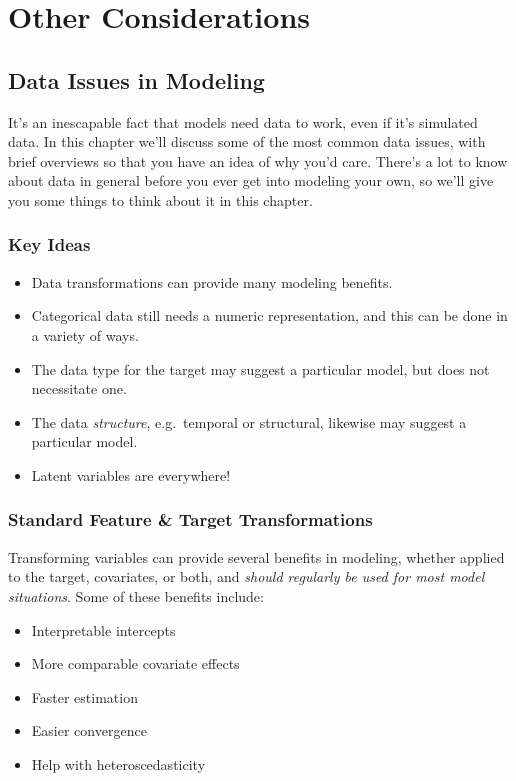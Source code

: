\documentclass[
  letterpaper,
]{krantz}
\providecommand{\tightlist}{%
  \setlength{\itemsep}{0pt}\setlength{\parskip}{0pt}}\usepackage{longtable,booktabs,array}
\begin{document}
\part{Other Considerations}

\chapter{Data Issues in Modeling}\label{sec-data}

It's an inescapable fact that models need data to work, even if it's
simulated data. In this chapter we'll discuss some of the most common
data issues, with brief overviews so that you have an idea of why you'd
care. There's a lot to know about data in general before you ever get
into modeling your own, so we'll give you some things to think about it
in this chapter.

\section{Key Ideas}\label{key-ideas-4}

\begin{itemize}
\tightlist
\item
  Data transformations can provide many modeling benefits.
\item
  Categorical data still needs a numeric representation, and this can be
  done in a variety of ways.
\item
  The data type for the target may suggest a particular model, but does
  not necessitate one.
\item
  The data \emph{structure}, e.g.~temporal or structural, likewise may
  suggest a particular model.
\item
  Latent variables are everywhere!
\end{itemize}

\section{Standard Feature \& Target
Transformations}\label{sec-data-transfromations}

Transforming variables can provide several benefits in modeling, whether
applied to the target, covariates, or both, and \emph{should regularly
be used for most model situations}. Some of these benefits include:

\begin{itemize}
\tightlist
\item
  Interpretable intercepts
\item
  More comparable covariate effects
\item
  Faster estimation
\item
  Easier convergence
\item
  Help with heteroscedasticity
\end{itemize}
\end{document}
